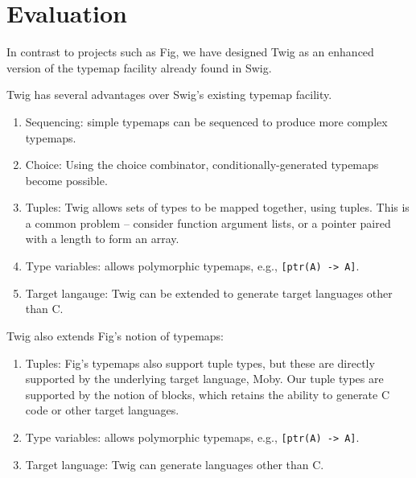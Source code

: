 
\section{Evaluation}

In contrast to projects such as Fig, we have designed Twig as an enhanced version of the typemap facility already found in Swig.

Twig has several advantages over Swig's existing typemap facility.

\begin{enumerate}
  \item Sequencing: simple typemaps can be sequenced to produce more complex typemaps.
  \item Choice: Using the choice combinator, conditionally-generated typemaps become possible.
  \item Tuples: Twig allows sets of types to be mapped together, using tuples. This is a common problem -- consider function argument lists, or a pointer paired with a length to form an array.
  \item Type variables: allows polymorphic typemaps, e.g., \texttt{[ptr(A) -> A]}.
  \item Target langauge: Twig can be extended to generate target languages other than C.
\end{enumerate}

Twig also extends Fig's notion of typemaps:

\begin{enumerate}
  \item Tuples: Fig's typemaps also support tuple types, but these are directly supported by the underlying target language, Moby. Our tuple types are supported by the notion of blocks, which retains the ability to generate C code or other target languages.
  \item Type variables: allows polymorphic typemaps, e.g., \texttt{[ptr(A) -> A]}.
  \item Target language: Twig can generate languages other than C.
\end{enumerate}